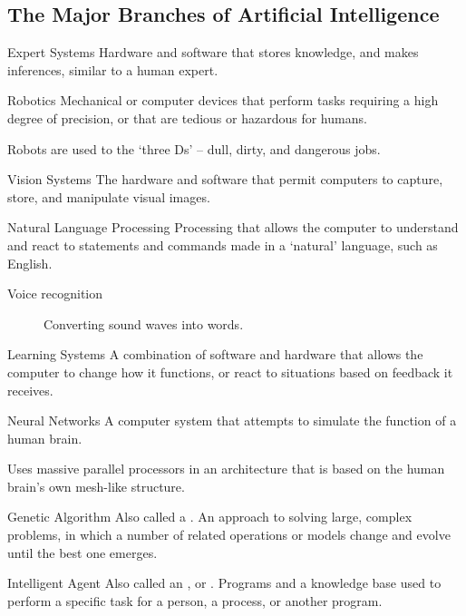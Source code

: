 \documentclass[\main/notes.tex]{subfiles}
\begin{document}
			\subsection{The Major Branches of Artificial Intelligence}
				\begin{definition}{Expert Systems}
						Hardware and software that stores knowledge, and makes inferences, similar to a human expert.
				\end{definition}
				\begin{definition}{Robotics}
					Mechanical or computer devices that perform tasks requiring a high degree of precision, or that are tedious or hazardous for humans.

					Robots are used to the `three Ds' -- dull, dirty, and dangerous jobs.
				\end{definition}
				\begin{definition}{Vision Systems}
					The hardware and software that permit computers to capture, store, and manipulate visual images.
				\end{definition}
				\begin{definition}{Natural Language Processing}
					Processing that allows the computer to understand and react to statements and commands made in a `natural' language, such as English.
					\begin{indentparagraph}
						\begin{description}
							\item[Voice recognition] Converting sound waves into words.
						\end{description}
					\end{indentparagraph}
				\end{definition}
				\begin{definition}{Learning Systems}
					A combination of software and hardware that allows the computer to change how it functions, or react to situations based on feedback it receives.
				\end{definition}
				\begin{definition}{Neural Networks}
					A computer system that attempts to simulate the function of a human brain.

					Uses massive parallel processors in an architecture that is based on the human brain's own mesh-like structure.
				\end{definition}
				\begin{definition}{Genetic Algorithm}
					Also called a . An approach to solving large, complex problems, in which a number of related operations or models change and evolve until the best one emerges.
				\end{definition}
				\begin{definition}{Intelligent Agent}
					Also called an , or . Programs and a knowledge base used to perform a specific task for a person, a process, or another program.
				\end{definition}

	\vbox{}
\end{document}
